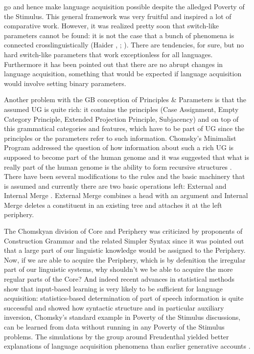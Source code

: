 go and hence make language acquisition possible despite the alledged Poverty of the Stimulus.
This general framework was very fruitful and inspired a lot of comparative work. However, it was
realized pretty soon that switch-like parameters cannot be found: it is not the case that a bunch of
phenomena is connected crosslinguistically (Haider \citeyear{Haider94c-u}, \citeyear[Section~2.2]{Haider2001a}; \citealp[Section~16.1]{MuellerGT-Eng1}). There are tendencies, for sure, but no hard switch-like
parameters that work exceptionless for all languages. Furthermore it has been pointed out that there
are no abrupt changes in language acquisition, something that would be expected if language
acquisition would involve setting binary parameters.

Another problem with the GB conception of Principles \& Parameters is that the assumed UG is quite
rich: it contains the principles (Case Assignment, Empty Category Principle, Extended Projection
Principle, Subjacency) and on top of this grammatical categories and features, which have to be part
of UG since the principles or the parameters refer to such information. Chomsky's Minimalist Program
addressed the question of how information about such a rich UG is supposed to become part of the
human genome and it was suggested that what is really part of the human genome is the ability to
form recursive structures \citep*{HCF2002a}. There have been several modifications to the rules and
the basic machinery that is assumed and currently there are two basic operations left: External and
Internal Merge \citep{Chomsky2001b-u}. External Merge combines a head with an argument and Internal Merge deletes a
constituent in an existing tree and attaches it at the left periphery.

The Chomskyan division of Core and Periphery was criticized by proponents of Construction Grammar
and the related Simpler Syntax since it was pointed out that a large part of our linguistic
knowledge would be assigned to the Periphery. Now, if we are able to acquire the Periphery, which is
by defenition the irregular part of our linguistic systems, why shouldn't we be able to acquire the
more regular parts of the Core? And indeed recent advances in statistical methods show that
input-based learning is very likely to be sufficient for language acquisition: statistics-based
determination of part of speech information is quite successful and \citet{Bod2009a} showed how
syntactic structure and in particular auxiliary inversion, Chomsky's standard example in Poverty of the Stimulus
discussions, can be learned from data without running in any Poverty of the Stimulus problems. The
simulations by the group around Freudenthal yielded better explanations of language acquisition phenomena than
earlier generative accounts \citep{FPAG2007a}.

